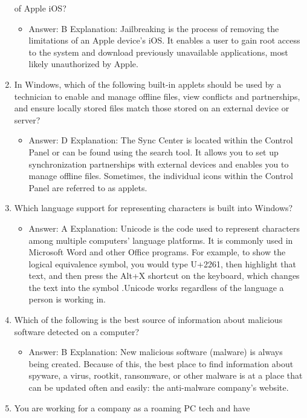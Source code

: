 \documentclass{article}
\begin{document}
\begin{enumerate}
of Apple iOS?
    \begin{itemize}
        \item Answer: B
Explanation: Jailbreaking is the process of removing the limitations of an Apple
device’s iOS. It enables a user to gain root access to the system and download previously
unavailable applications, most likely unauthorized by Apple.
    \end{itemize}
    \item In Windows, which of the following built-in applets should be used
by a technician to enable and manage offline files, view conflicts
and partnerships, and ensure locally stored files match those
stored on an external device or server?
    \begin{itemize}
        \item Answer: D
Explanation: The Sync Center is located within the Control Panel or can be found using
the search tool. It allows you to set up synchronization partnerships with external
devices and enables you to manage offline files. Sometimes, the individual icons within
the Control Panel are referred to as applets.
    \end{itemize}
    \item Which language support for representing characters is built into
Windows?
    \begin{itemize}
        \item Answer: A
Explanation: Unicode is the code used to represent characters among multiple computers’
language platforms. It is commonly used in Microsoft Word and other Office
programs. For example, to show the logical equivalence symbol, you would type
U+2261, then highlight that text, and then press the Alt+X shortcut on the keyboard,
which changes the text into the symbol .Unicode works regardless of the language
a person is working in.
    \end{itemize}
    \item Which of the following is the best source of information about
malicious software detected on a computer?
    \begin{itemize}
        \item Answer: B
Explanation: New malicious software (malware) is always being created. Because of
this, the best place to find information about spyware, a virus, rootkit, ransomware,
or other malware is at a place that can be updated often and easily: the anti-malware
company’s website.
    \end{itemize}
    \item You are working for a company as a roaming PC tech and have

\end{enumerate}
\end{document}
